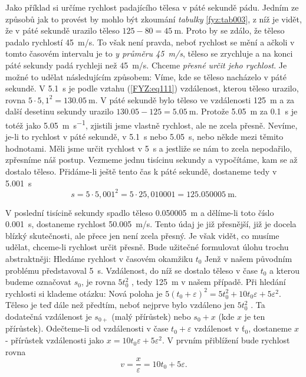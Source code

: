 {    Jako příklad si určíme rychlost padajícího tělesa v páté sekundě pádu. Jedním ze způsobů jak to 
    provést by mohlo být zkoumání \emph{tabulky} \ref{fyz:tab003}, z níž je vidět, že v páté 
    sekundě urazilo těleso \(125 - 80 = \SI{45}{\m}\). Proto by se zdálo, že těleso padalo 
    rychlostí \SI{45}{\m/\s}. To však není pravda, neboť rychlost se mění a ačkoli v tomto časovém 
    intervalu je to \emph{y průměru \SI{45}{\m/\s}}, těleso se zrychluje a na konci páté sekundy 
    padá rychleji než \SI{45}{\m/\s}. Chceme \emph{přesné určit jeho rychlost}. Je možné to udělat 
    následujícím způsobem: Víme, kde se těleso nacházelo v páté sekundě. V \SI{5.1}{\s} je podle 
    vztahu (\ref{FYZ:eq111}) vzdálenost, kterou těleso urazilo, rovna \(5\cdot5,1^2 = \SI{130.05} 
    {\m}\). V páté sekundě bylo těleso ve vzdálenosti \SI{125}{\m} a za další desetinu sekundy 
    urazilo \(\num{130.05} - \num{125} = \SI{5.05}{\m}\). Protože \SI{5.05}{\m} za \SI{0.1}{\s} je 
    totéž jako \SI{5.05}{\m\per\s}, zjistili jsme vlastně rychlost, ale ne zcela přesně. Nevíme, 
    je-li to rychlost v páté sekundě, v \SI{5.1}{\s} nebo \SI{5.05}{\s}, nebo někde mezi těmito 
    hodnotami. Měli jsme určit rychlost v \SI{5}{\s} a jestliže se nám to zcela nepodařilo, 
    zpřesníme náš postup. Vezmeme jednu tisícinu sekundy a vypočítáme, kam se až dostalo těleso. 
    Přidáme-li ještě tento čas k páté sekundě, dostaneme tedy v \SI{5.001}{\s}
    \begin{equation}\label{FYZ:eq115}
      s = 5\cdot5,001^2 = 5\cdot25,010001 = \SI{125.050005}{\m}.
    \end{equation}
    
    V poslední tisícině sekundy spadlo těleso \SI{0.050005}{\m} a dělíme-li toto číslo 
    \SI{0.001}{\s}, dostaneme rychlost \SI{50.005}{\m/\s}. Tento údaj je již přesnější, již je 
    docela blízký skutečnosti, ale přece jen není zcela přesný. Je však vidět, co musíme udělat, 
    chceme-li rychlost určit přesně. Bude užitečné formulovat úlohu trochu abstraktněji: Hledáme 
    rychlost v časovém okamžiku \(t_0\) Jenž v našem původním problému představoval \SI{5}{\s}. 
    Vzdálenost, do níž se dostalo těleso v čase \(t_0\) a kterou budeme označovat \(s_0\), je rovna 
    \(5t_0^2\) , tedy \SI{125}{\m} v našem případě. Při hledání rychlosti si klademe otázku: 
     Nová poloha 
    je \(5(t_0 + \varepsilon)^2 = 5t_0^2 + 10t_0\varepsilon + 5\varepsilon^2\). Těleso je teď dále 
    než předtím, neboť nejprve bylo vzdáleno jen \(5t_0^2\) . Ta dodatečná vzdálenost je \(s_{0+}\) 
    (malý přírůstek) nebo \(s_0 + x\) (kde \(x\) je ten přírůstek). Odečteme-li od vzdálenosti 
    v čase \(t_0 + \varepsilon\) vzdálenost v \(ť_0\), dostaneme \(x\) - přírůstek vzdálenosti jako 
    \(x = 10t_0\varepsilon +5\varepsilon^2\). V prvním přiblížení bude rychlost rovna
    \begin{equation}\label{FYZ:eq116}
      v = \frac{x}{\varepsilon} = 10t_0 +5\varepsilon.
    \end{equation}
    
}
